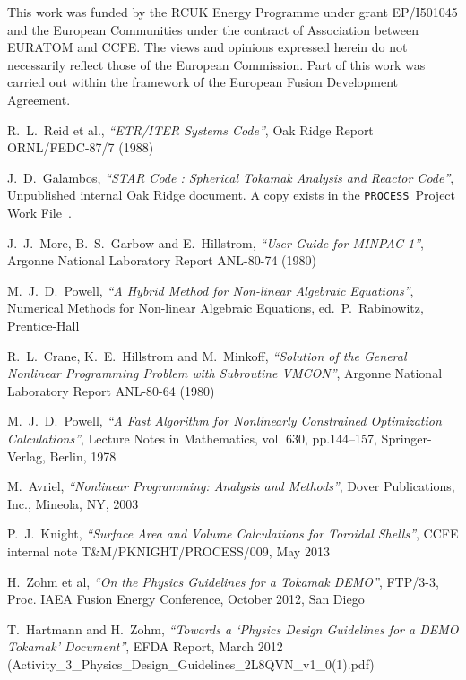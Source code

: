 \documentclass[11pt,a4paper]{report}
\newcommand{\process}{\mbox{\texttt{PROCESS}}}
\begin{document}
This work was funded by the RCUK Energy Programme under grant EP/I501045 and
the European Communities under the contract of Association between EURATOM and
CCFE\@. The views and opinions expressed herein do not necessarily reflect those
of the European Commission. Part of this work was carried out within the
framework of the European Fusion Development Agreement.

\begin{thebibliography}{99}

R.\ L.\ Reid et al.,
\textit{``ETR/ITER Systems Code''},
Oak Ridge Report ORNL/FEDC-87/7
(1988)

J.\ D.\ Galambos,
\textit{``STAR Code : Spherical Tokamak Analysis and Reactor Code''},
Unpublished internal Oak Ridge document. A copy exists in the \process\
Project Work File~\cite{PWF}.

J.\ J.\ More, B.\ S.\ Garbow and E.\ Hillstrom,
\textit{``User Guide for MINPAC-1''},
Argonne National Laboratory Report ANL-80-74
(1980)

M.\ J.\ D.\ Powell,
\textit{``A Hybrid Method for Non-linear Algebraic Equations''},
Numerical Methods for Non-linear Algebraic Equations, ed.\ P.\ Rabinowitz,
Prentice-Hall

R.\ L.\ Crane, K.\ E.\ Hillstrom and M.\ Minkoff,
\textit{``Solution of the General Nonlinear Programming Problem with
Subroutine VMCON''},
Argonne National Laboratory Report ANL-80-64
(1980)

M.\ J.\ D.\ Powell,
\textit{``A Fast Algorithm for Nonlinearly Constrained Optimization Calculations''},
Lecture Notes in Mathematics, vol. 630, pp.144--157, Springer-Verlag, Berlin, 1978

M.\ Avriel,
\textit{``Nonlinear Programming: Analysis and Methods''},
Dover Publications, Inc., Mineola, NY, 2003

P.\ J.\ Knight,
\textit{``Surface Area and Volume Calculations for Toroidal Shells''},
CCFE internal note T\&M/PKNIGHT/PROCESS/009, May 2013

H.\ Zohm et al,
\textit{``On the Physics Guidelines for a Tokamak DEMO''},
FTP/3-3, Proc. IAEA Fusion Energy Conference, October 2012, San Diego

T.\ Hartmann and H.\ Zohm,
\textit{``Towards a `Physics Design Guidelines for a DEMO Tokamak'
  Document''},
EFDA Report, March 2012 (Activity\_3\_Physics\_Design\_Guidelines\_2L8QVN\_v1\_0(1).pdf)


\end{thebibliography}
\end{document}
